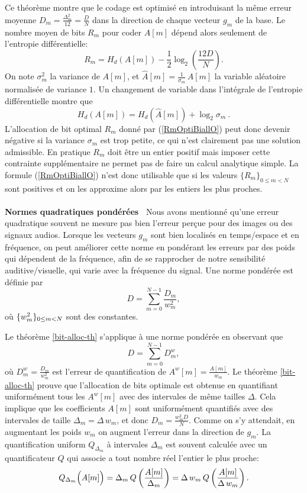 Ce th\'eor\`eme montre que le codage est optimis\'e en
introduisant la m\^eme erreur moyenne
$D_m = \frac {\Delta_m^2} {12} = \frac D N$ dans la direction
de chaque vecteur $g_m$ de la base. Le nombre moyen de bits
$R_m$ pour coder $A[m]$ d\'epend alors seulement
de l'entropie diff\'erentielle:
\begin{equation}
\label{RmOptiBiallO}
R_m = H_d (A[m]) -  \frac 1 2 \log_2 \left(\frac {12 D} N \right) .
\end{equation}
On note $\sigma_m^2$ la variance de $A[m]$, et
$\hat A [m] = \frac 1 {\sigma_m} \, A[m]$ la variable al\'eatoire
normalis\'ee de variance $1$. Un changement de variable dans
l'int\'egrale de l'entropie diff\'erentielle montre que
\[
H_d (A[m]) = H_d (\hat A[m]) + \log_2 \sigma_m~.
\]
L'allocation de bit optimal $R_m$ donn\'e par
(\ref{RmOptiBiallO}) peut donc devenir n\'egative si
la variance $\sigma_m$ est trop petite, ce qui n'est clairement
pas une solution admissible.
En pratique $R_m$ doit \^etre un entier positif mais imposer cette
contrainte suppl\'ementaire ne permet pas de faire un
calcul analytique simple. La formule (\ref{RmOptiBiallO}) n'est donc
utilisable que si les valeurs $\{R_m\}_{0 \leq m < N}$
sont positives et on les
approxime alors par les entiers les plus proches.
\\
\\
{\bf Normes quadratiques pond\'er\'ees\ } 
Nous avons mentionn\'e qu'une erreur quadratique souvent ne
mesure pas bien l'erreur per\c{c}ue pour des images ou des
signaux audios. Lorsque les vecteurs
$g_m$ sont bien localis\'es en temps/espace et en fr\'equence,
on peut am\'eliorer cette norme
en pond\'erant les erreurs par des poids qui d\'ependent
de la fr\'equence, afin de se rapprocher de notre sensibilit\'e
auditive/visuelle, qui varie avec la fr\'equence du signal.
Une norme pond\'er\'ee est d\'efinie par
\begin{equation}
\label{weight-normed}
D =  \sum_{m=0}^{N-1} \frac{D_m} {w_m^2} ,
\end{equation}
o\`u $\{ w_m^2\}_{ 0 \leq m < N}$ sont des constantes.

Le th\'eor\`eme \ref{bit-alloc-th} s'applique
\`a une norme pond\'er\'ee en observant que
\[
D =  \sum_{m=0}^{N-1} D^w_m,
\]
o\`u $D^w_m =  \frac {D_m} {w_m^2}$
est l'erreur de quantification de $A^w [m] = \frac {A[m]} {w_m}$.
Le th\'eor\`eme \ref{bit-alloc-th}
prouve que l'allocation de bits optimale
est obtenue en quantifiant uniform\'ement
tous les $A^w [m]$ avec des intervales de m\^eme tailles $\Delta$.
Cela implique que les
coefficients $A[m]$ sont uniform\'ement quantifi\'es
avec des intervales de taille
$\Delta_m =  {\Delta}\, {w_m}$, et donc
$D_m = \frac {w_m^2 D}  {N}$.
Comme on s'y attendait, en augmentant les poids $w_m$ on
augment l'erreur dans la direction de $g_m$.
La quantification uniform
$Q_{\Delta_m}$ \`a intervales
$\Delta_m$ est souvent calcul\'ee avec un quantificateur
$Q$ qui associe a tout nombre r\'eel l'entier le plus proche:
\begin{equation}
\label{variable-unifo-quan}
Q_{\Delta_m}\Bigl(A[m]\Bigr) = \Delta_m\, Q\left (\frac {A[m]} {\Delta_m}\right) =
{\Delta}\, {w_m}\, Q \left(\frac {A[m]} {\Delta\,w_m}\right) .
\end{equation}


